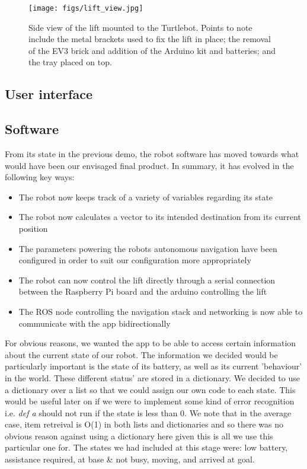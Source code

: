 \documentclass{article}
\begin{document}
\begin{figure}
  \begin{center}
    \texttt{[image: figs/lift\_view.jpg]}
    \caption{Side view of the lift mounted to the Turtlebot. Points to note include the metal brackets used to fix the lift in place; the removal of the EV3 brick and addition of the Arduino kit and batteries; and the tray placed on top.}
  \label{fig:lift}
  \end{center}
\end{figure}

\subsection{User interface}

\subsection{Software}

From its state in the previous demo, the robot software has moved towards what would have been our envisaged final product. In summary, it has evolved in the following key ways:

\begin{itemize}
  \item The robot now keeps track of a variety of variables regarding its state
  \item The robot now calculates a vector to its intended destination from its current position
  \item The parameters powering the robots autonomous navigation have been configured in order to suit our configuration more appropriately
  \item The robot can now control the lift directly through a serial connection between the Raspberry Pi board and the arduino controlling the lift
  \item The ROS node controlling the navigation stack and networking is now able to communicate with the app bidirectionally
\end{itemize}

For obvious reasons, we wanted the app to be able to access certain information about the current state of our robot. The information we decided would be particularly important is the state of its battery, as well as its current 'behaviour' in the world. These different status' are stored in a dictionary. We decided to use a dictionary over a list so that we could assign our own code to each state. This would be useful later on if we were to implement some kind of error recognition i.e. {\it def a} should not run if the state is less than 0. We note that in the average case, item retreival is O(1) in both lists and dictionaries and so there was no obvious reason against using a dictionary here given this is all we use this particular one for. The states we had included at this stage were: low battery, assistance required, at base \& not busy, moving, and arrived at goal.
\end{document}
